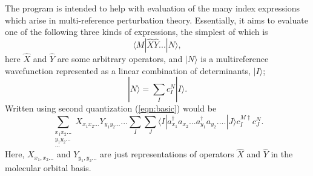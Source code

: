 The program is intended to help with evaluation of the many index expressions
which arise in multi-reference perturbation theory.  Essentially, it aims to
evaluate one of the following three kinds of expressions, the simplest of which
is
\begin{equation}
\langle M | \hat{X} \hat{Y} ... | N \rangle,
\label{eqn:basic}
\end{equation}
\noindent here $\hat{X}$ and $\hat{Y}$ are some arbitrary operators, and $| N
\rangle$  is a multireference wavefunction represented as a linear combination
of determinants, $|I\rangle $;
\begin{equation}
|N\rangle = \sum_{I} c_{I}^{N}| I \rangle.
\end{equation} 
\noindent Written using second quantization (\ref{eqn:basic}) would be
\begin{equation}
\sum_{\substack{ x_{1}x_{2}...\\ y_{1}y_{2}... \\ ...}} X_{x_{1}x_{2}...} Y_{y_{1}y_{2}...} ...
\sum_{I}\sum_{J}
\langle I | a^{\dagger}_{x_{1}} a_{x_{2}}...a^{\dagger}_{y_{1}}a_{y_{2}}....| J \rangle 
 c^{M \dagger}_{I}c^{N}_{J}.
\label{eqn:basic_2nd_quantized}
\end{equation}
\noindent  Here, $X_{x_{1},x_{2}...}$ and $Y_{y_{1},y_{2}...}$ are just representations of operators 
$\hat{X}$ and $\hat{Y}$ in the molecular orbital basis.\\

